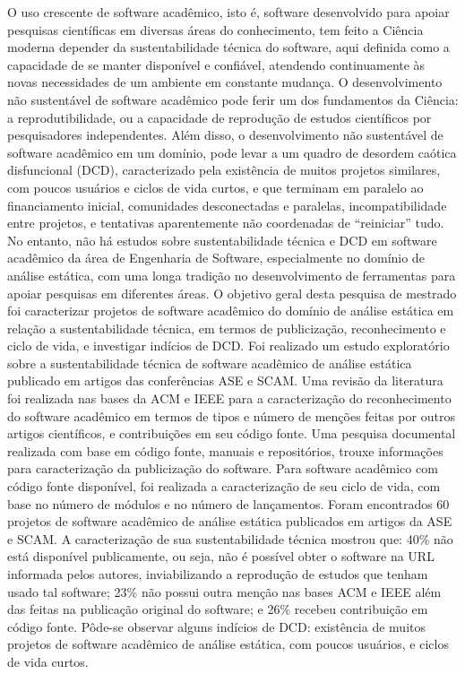 O uso crescente de software acadêmico, isto é, software desenvolvido para
apoiar pesquisas científicas em diversas áreas do conhecimento, tem feito
a Ciência moderna depender da sustentabilidade técnica do software, aqui
definida como a capacidade de se manter disponível e confiável, atendendo
continuamente às novas necessidades de um ambiente em constante mudança.
%
O desenvolvimento não sustentável de software acadêmico pode ferir um dos
fundamentos da Ciência: a reprodutibilidade, ou a capacidade de reprodução de
estudos científicos por pesquisadores independentes.
%
Além disso, o desenvolvimento não sustentável de software acadêmico em um
domínio, pode levar a um quadro de desordem caótica disfuncional (DCD),
caracterizado pela existência de muitos projetos similares, com poucos usuários
e ciclos de vida curtos, e que terminam em paralelo ao financiamento inicial,
comunidades desconectadas e paralelas, incompatibilidade entre projetos, e
tentativas aparentemente não coordenadas de ``reiniciar'' tudo.
%
No entanto, não há %
estudos sobre sustentabilidade técnica e DCD em software acadêmico da
área de Engenharia de Software, especialmente no domínio de análise estática,
com uma longa tradição no desenvolvimento de ferramentas para apoiar pesquisas
em diferentes áreas.
%
O objetivo geral desta pesquisa de mestrado foi caracterizar projetos de
software acadêmico do domínio de análise estática em relação a sustentabilidade
técnica, em termos de publicização, reconhecimento e ciclo de vida, 
e investigar indícios de DCD.
%
Foi realizado um estudo exploratório sobre a sustentabilidade técnica de
software acadêmico de análise estática publicado em artigos 
das conferências ASE e SCAM.
%
Uma revisão da literatura foi realizada nas bases da ACM e IEEE
para a caracterização do reconhecimento do software acadêmico
em termos de tipos e número de menções feitas por outros artigos científicos, e
contribuições em seu código fonte.
%
Uma pesquisa documental realizada com base em código fonte, manuais e
repositórios, trouxe informações para caracterização da publicização do software.
%
Para software acadêmico com código fonte disponível, 
foi realizada a caracterização de seu ciclo de vida,
com base no número de módulos e no número de lançamentos.
%
Foram encontrados 60 projetos de software acadêmico de análise estática
publicados em artigos da ASE e SCAM.
%
A caracterização de sua sustentabilidade técnica mostrou que: 
40\% não está disponível publicamente, ou seja, não é possível obter 
o software na URL informada pelos autores, inviabilizando 
a reprodução de estudos que tenham usado tal software;
%
23\% não possui outra menção nas bases ACM e IEEE além das feitas na publicação original
do software; e 26\% recebeu contribuição em código fonte.
%
Pôde-se observar alguns indícios de DCD: 
existência de muitos projetos de software acadêmico de análise estática, %
com poucos usuários, e ciclos de vida curtos.
